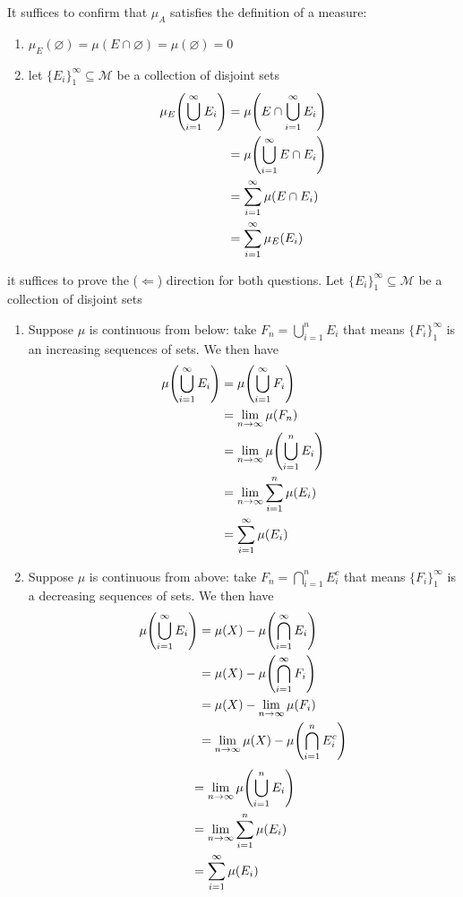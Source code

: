 \documentclass{article}
\begin{document}
\begin{homeworkProblem}
    It suffices to confirm that $\mu_A$ satisfies the definition of a measure:
    \begin{enumerate}
        \item $\mu_E(\varnothing)=\mu(E\cap\varnothing)=\mu(\varnothing)=0$
        \item let $\{E_i\}_1^\infty\subseteq\mathcal{M}$ be a collection of disjoint sets
        \begin{align*}
            \mu_E\lp\bigcup_{i=1}^\infty E_i\rp &= \mu\lp E\cap\bigcup_{i=1}^\infty E_i\rp \\
            &= \mu\lp\bigcup_{i=1}^\infty E\cap E_i\rp \\
            &= \sum_{i=1}^\infty\mu(E\cap E_i) \\
            &= \sum_{i=1}^\infty\mu_E(E_i)
        \end{align*}
    \end{enumerate}
\end{homeworkProblem}
\begin{homeworkProblem}
    it suffices to prove the ($\Leftarrow$) direction for both questions. Let $\{E_i\}_1^\infty\subseteq \mathcal{M}$ be a collection of disjoint sets
    \begin{enumerate}
        \item Suppose $\mu$ is continuous from below: take $F_n=\bigcup_{i=1}^nE_i$ that means $\{F_i\}_1^\infty$ is an increasing sequences of sets. We then have
        \begin{align*}
            \mu\lp\bigcup_{i=1}^\infty E_i\rp &= \mu\lp\bigcup_{i=1}^\infty F_i\rp \\
            &= \lim_{n\to \infty}\mu(F_n) \\
            &=\lim_{n\to\infty}\mu\lp\bigcup_{i=1}^nE_i\rp \\
            &=\lim_{n\to\infty}\sum_{i=1}^n\mu(E_i) \\
            &=\sum_{i=1}^\infty\mu(E_i)
        \end{align*}
        \item Suppose $\mu$ is continuous from above: take $F_n=\bigcap_{i=1}^nE^c_i$ that means $\{F_i\}_1^\infty$ is a decreasing sequences of sets. We then have
        \begin{align*}
            \mu\lp\bigcup_{i=1}^\infty E_i\rp &= \mu(X)-\mu\lp\bigcap_{i=1}^\infty E_i\rp \\
            &=\mu(X)-\mu\lp\bigcap_{i=1}^\infty F_i\rp \\
            &=\mu(X)-\lim_{n\to\infty}\mu(F_i) \\
            &= \lim_{n\to \infty}\mu(X)-\mu\lp\bigcap_{i=1}^nE^c_i\rp \\
        \end{align*}
        \begin{align*}
            &=\lim_{n\to\infty}\mu\lp\bigcup_{i=1}^nE_i\rp \\
            &=\lim_{n\to\infty}\sum_{i=1}^n\mu(E_i) \\
            &=\sum_{i=1}^\infty\mu(E_i)
        \end{align*}
    \end{enumerate}
\end{homeworkProblem}
\end{document}
